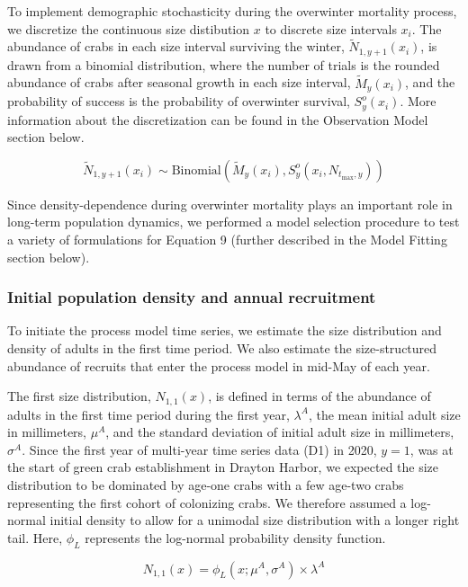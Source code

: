 \documentclass{article}
\begin{document}
To implement demographic stochasticity during the overwinter mortality process, we discretize the continuous size distibution $x$ to discrete size intervals $x_i$. The abundance of crabs in each size interval surviving the winter, $\tilde{N}_{1,y+1}(x_i)$, is drawn from a binomial distribution, where the number of trials is the rounded abundance of crabs after seasonal growth in each size interval, $\tilde{M}_y(x_i)$, and the probability of success is the probability of overwinter survival, $S^o_y(x_i)$. More information about the discretization can be found in the Observation Model section below.

\begin{equation}
\tilde{N}_{1,y+1}(x_i) \sim \text{Binomial}\left(\tilde{M}_y(x_i),  S_y^o(x_i, N_{t_{\text{max}},y})\right)
\end{equation}

Since density-dependence during overwinter mortality plays an important role in long-term population dynamics, we performed a model selection procedure to test a variety of formulations for Equation 9 (further described in the Model Fitting section below).

\subsubsection*{Initial population density and annual recruitment}

To initiate the process model time series, we estimate the size distribution and density of adults in the first time period. We also estimate the size-structured abundance of recruits that enter the process model in mid-May of each year. 

The first size distribution, $N_{1, 1}(x)$, is defined in terms of the abundance of adults in the first time period during the first year, $\lambda^{A}$, the mean initial adult size in millimeters, $\mu^A$, and the standard deviation of initial adult size in millimeters, $\sigma^A$. Since the first year of multi-year time series data (D1) in 2020, $y = 1$, was at the start of green crab establishment in Drayton Harbor, we expected the size distribution to be dominated by age-one crabs with a few age-two crabs representing the first cohort of colonizing crabs. We therefore assumed a log-normal initial density to allow for a unimodal size distribution with a longer right tail. Here, $\phi_L$ represents the log-normal probability density function.

\begin{equation}
N_{1, 1}(x) = \phi_L(x; \mu^A, \sigma^A) \times \lambda^A
\end{equation}
\end{document}
